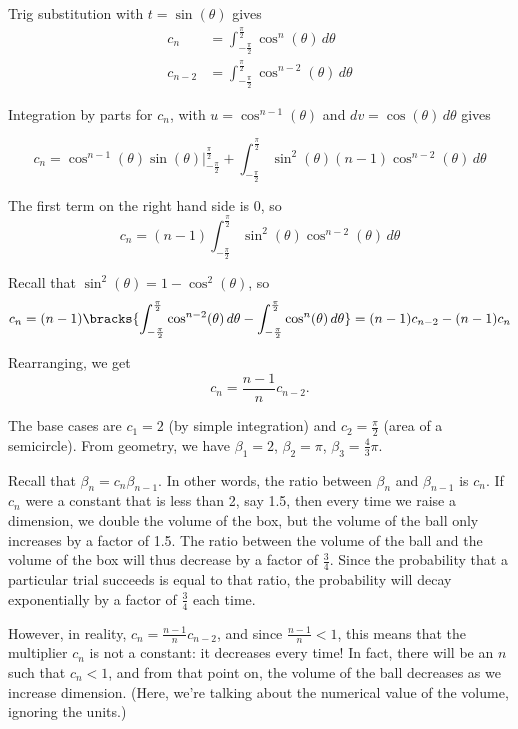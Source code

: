 \documentclass{article}
\begin{document}
Trig substitution with $t = \sin(\theta)$ gives
\begin{align*}
  c_n     & = \int_{-\frac{\pi}{2}}^{\frac{\pi}{2}} \cos^{n}(\theta) \, d\theta   \\
  c_{n-2} & = \int_{-\frac{\pi}{2}}^{\frac{\pi}{2}} \cos^{n-2}(\theta) \, d\theta
\end{align*}

Integration by parts for $c_n$, with $u = \cos^{n-1}(\theta)$ and $dv = \cos(\theta) \, d\theta$ gives

\[
  c_n = \cos^{n-1}(\theta) \sin(\theta) \bigg|_{-\frac{\pi}{2}}^{\frac{\pi}{2}} + \int_{-\frac{\pi}{2}}^{\frac{\pi}{2}} \sin^2(\theta) (n-1) \cos^{n-2}(\theta) \, d\theta
\]

The first term on the right hand side is 0, so
\[
  c_n = (n-1) \int_{-\frac{\pi}{2}}^{\frac{\pi}{2}} \sin^2(\theta) \cos^{n-2}(\theta) \, d\theta
\]

Recall that $\sin^2(\theta) = 1 - \cos^2(\theta)$, so
\[
  c_n = (n-1) \bracks{\int_{-\frac{\pi}{2}}^{\frac{\pi}{2}} \cos^{n-2}(\theta) \, d\theta - \int_{-\frac{\pi}{2}}^{\frac{\pi}{2}} \cos^n(\theta) \, d\theta} = (n-1) c_{n-2} - (n-1) c_n
\]

Rearranging, we get
\[
  c_n = \frac{n-1}{n}c_{n-2}.
\]

The base cases are $c_1 = 2$ (by simple integration) and $c_2 = \frac{\pi}{2}$ (area of a semicircle). From geometry, we have $\beta_1 = 2$, $\beta_2 = \pi$, $\beta_3 = \frac{4}{3}\pi$.

Recall that $\beta_n = c_n \beta_{n - 1}$. In other words, the ratio between $\beta_n$ and $\beta_{n - 1}$ is $c_n$. If $c_n$ were a constant that is less than 2, say 1.5, then every time we raise a dimension, we double the volume of the box, but the volume of the ball only increases by a factor of 1.5. The ratio between the volume of the ball and the volume of the box will thus decrease by a factor of $\frac{3}{4}$. Since the probability that a particular trial succeeds is equal to that ratio, the probability will decay exponentially by a factor of $\frac{3}{4}$ each time.

However, in reality, $c_n = \frac{n-1}{n}c_{n-2}$, and since $\frac{n-1}{n} < 1$, this means that the multiplier $c_n$ is not a constant: it decreases every time! In fact, there will be an $n$ such that $c_n < 1$, and from that point on, the volume of the ball decreases as we increase dimension. (Here, we're talking about the numerical value of the volume, ignoring the units.)
\end{document}
